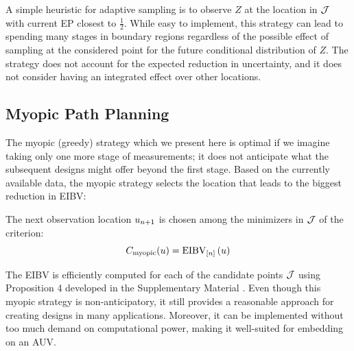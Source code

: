 \documentclass[aoas]{imsart}
\begin{document}
A simple heuristic for adaptive sampling is to observe $Z$ at the
location in $\mathcal{J}$ with current EP closest to
$\frac{1}{2}$. While easy to implement, this strategy can lead to
spending many stages in boundary regions regardless of the possible
effect of sampling at the considered point for the future conditional
distribution of $Z$. The strategy does not account for the expected
reduction in uncertainty, and it does not consider having an
integrated effect over other locations.


\subsection{Myopic Path Planning}
\label{sec:myopic}

The myopic (greedy) strategy which we present here is optimal if we
imagine taking only one more stage of measurements; it does not
anticipate what the subsequent designs might offer beyond the first
stage.  Based on the currently available data, the myopic strategy
selects the location that leads to the biggest reduction in EIBV:
\begin{criterion}[Myopic]
The next observation location $u_{n + 1}$ is chosen among
the minimizers in $\mathcal{J}$ of the criterion: 
\begin{equation}\label{critSEQ}
     C_{\text{myopic}}(u) = \EIBV_{[\stage]}\left(\spatloc\right)
\end{equation}
\end{criterion}

The EIBV is efficiently computed for each of the candidate points
$\mathcal{J}$ using Proposition 4 developed in the Supplementary Material \citep{suppA}. 
Even though this myopic strategy is non-anticipatory, it still
provides a reasonable approach for creating designs in many
applications. Moreover, it can be implemented without too much demand on
computational power, making it well-suited for embedding on an AUV.
\end{document}
